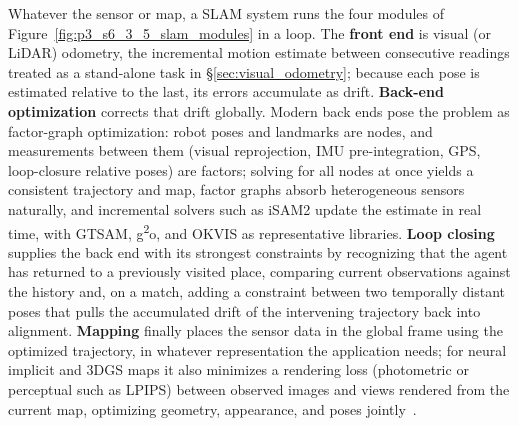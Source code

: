Whatever the sensor or map, a SLAM system runs the four modules of Figure~\ref{fig:p3_s6_3_5_slam_modules} in a loop.
The \textbf{front end} is visual (or LiDAR) odometry, the incremental motion estimate between consecutive readings treated as a stand-alone task in \S\ref{sec:visual_odometry}; because each pose is estimated relative to the last, its errors accumulate as drift.
\textbf{Back-end optimization} corrects that drift globally. Modern back ends pose the problem as factor-graph optimization: robot poses and landmarks are nodes, and measurements between them (visual reprojection, IMU pre-integration, GPS, loop-closure relative poses) are factors; solving for all nodes at once yields a consistent trajectory and map, factor graphs absorb heterogeneous sensors naturally, and incremental solvers such as iSAM2 update the estimate in real time, with GTSAM, g\textsuperscript{2}o, and OKVIS as representative libraries.
\textbf{Loop closing} supplies the back end with its strongest constraints by recognizing that the agent has returned to a previously visited place, comparing current observations against the history and, on a match, adding a constraint between two temporally distant poses that pulls the accumulated drift of the intervening trajectory back into alignment.
\textbf{Mapping} finally places the sensor data in the global frame using the optimized trajectory, in whatever representation the application needs; for neural implicit and 3DGS maps it also minimizes a rendering loss (photometric or perceptual such as LPIPS) between observed images and views rendered from the current map, optimizing geometry, appearance, and poses jointly~\cite{Keetha2024SplaTAM}.

